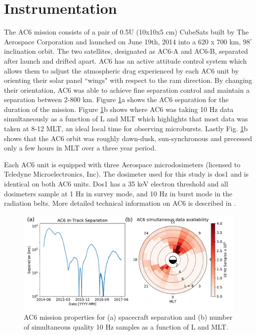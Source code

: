 \documentclass[draft]{agujournal2019}
\begin{document}
\section{Instrumentation} \label{instrumentation}
The AC6 mission consists of a pair of 0.5U (10x10x5 cm) CubeSats built by The Aerospace Corporation and launched on June 19th, 2014 into a 620 x 700 km, $98^\circ$ inclination orbit. The two satellites, designated as AC6-A and AC6-B, separated after launch and drifted apart. AC6 has an active attitude control system which allows them to adjust the atmospheric drag experienced by each AC6 unit by orienting their solar panel ``wings" with respect to the ram direction. By changing their orientation, AC6 was able to achieve fine separation control and maintain a separation between 2-800 km. Figure \ref{fig1}a shows the AC6 separation for the duration of the mission. Figure \ref{fig1}b shows where AC6 was taking 10 Hz data simultaneously as a function of L and MLT which highlights that most data was taken at 8-12 MLT, an ideal local time for observing microbursts. Lastly Fig. \ref{fig1}b shows that the AC6 orbit was roughly dawn-dusk, sun-synchronous and precessed only a few hours in MLT over a three year period.

Each AC6 unit is equipped with three Aerospace microdosimeters (licensed to Teledyne Microelectronics, Inc). The dosimeter used for this study is dos1 and is identical on both AC6 units. Dos1 has a 35 keV electron threshold and all dosimeters sample at 1 Hz in survey mode, and 10 Hz in burst mode in the radiation belts. More detailed technical information on AC6 is described in . 

\begin{figure}
\includegraphics[width=\textwidth]{fig1.pdf}
\caption{AC6 mission properties for (a) spacecraft separation and (b) number of simultaneous quality 10 Hz samples as a function of L and MLT.} \label{fig1}
\end{figure}
\end{document}
